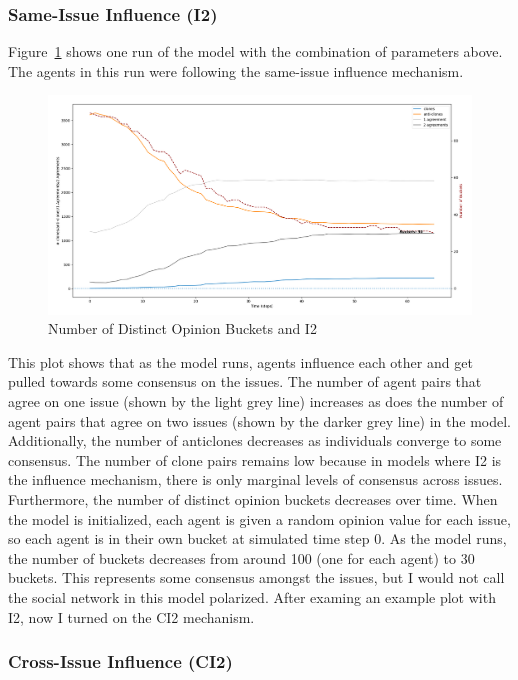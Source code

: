 \subsubsection{Same-Issue Influence (I2)}

Figure~\ref{H3a_census_I2} shows one run of the model with the combination of parameters above. The agents in this run were following the same-issue influence mechanism. 

\begin{figure}
\centering
\includegraphics[width=1.0\columnwidth]{./Graphs/census3I2.png}
\caption{Number of Distinct Opinion Buckets and I2}
\label{H3a_census_I2}
\end{figure}

This plot shows that as the model runs, agents influence each other and get pulled towards some consensus on the issues. The number of agent pairs that agree on one issue (shown by the light grey line) increases as does the number of agent pairs that agree on two issues (shown by the darker grey line) in the model. Additionally, the number of anticlones decreases as individuals converge to some consensus. The number of clone pairs remains low because in models where I2 is the influence mechanism, there is only marginal levels of consensus across issues. Furthermore, the number of distinct opinion buckets decreases over time. When the model is initialized, each agent is given a random opinion value for each issue, so each agent is in their own bucket at simulated time step 0. As the model runs, the number of buckets decreases from around 100 (one for each agent) to 30 buckets. This represents some consensus amongst the issues, but I would not call the social network in this model polarized. After examing an example plot with I2, now I turned on the CI2 mechanism.

\subsubsection{Cross-Issue Influence (CI2)}

